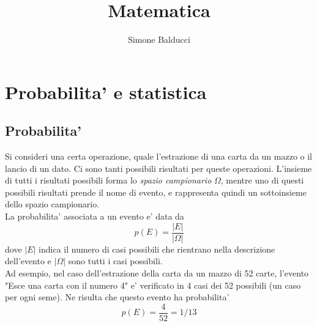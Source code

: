 \documentclass[12pt]{article}
\title{Matematica}
\author{Simone Balducci}
\date{}
\begin{document}
\maketitle
\section{Probabilita' e statistica}
\subsection{Probabilita'}
Si consideri una certa operazione, quale l'estrazione di una carta da un mazzo o il lancio di un dato. Ci sono tanti possibili risultati per queste operazioni. L'insieme di tutti i risultati possibili forma lo \textit{spazio campionario} $\Omega$, mentre uno di questi possibili risultati prende il nome di evento, e rappresenta quindi un sottoinsieme dello spazio campionario. \\
La probabilita' associata a un evento e' data da
$$
	p(E) = \frac{|E|}{|\Omega|}
$$
dove $|E|$ indica il numero di casi possibili che rientrano nella descrizione dell'evento e $|\Omega|$ sono tutti i casi possibili. \\
Ad esempio, nel caso dell'estrazione della carta da un mazzo di 52 carte, l'evento "Esce una carta con il numero 4" e' verificato in 4 casi dei 52 possibili (un caso per ogni seme). Ne risulta che questo evento ha probabilita' 
$$
	p(E) = \frac{4}{52} = 1/13 
$$
\end{document}
